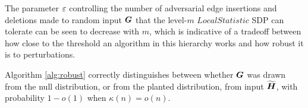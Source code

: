 \begin{remark}
    The parameter $\varepsilon$ controlling the number of adversarial edge insertions and deletions made to random input $\boldsymbol{G}$ that the level-$m$ $LocalStatistic$ SDP can tolerate can be seen to decrease with $m$, which is indicative of a tradeoff between how close to the threshold an algorithm in this hierarchy works and how robust it is to perturbations.
\end{remark}

\begin{corollary}
	Algorithm \ref{alg:robust} correctly distinguishes between whether $\boldsymbol{G}$ was drawn from the null distribution, or from the planted distribution, from input $\widetilde{\boldsymbol{H}}$, with probability $1-o(1)$ when $\kappa(n) = o(n)$.
\end{corollary}